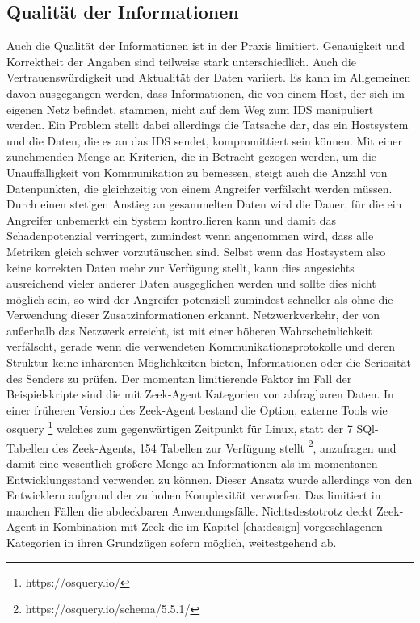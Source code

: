 \subsection{Qualität der Informationen}
Auch die Qualität der Informationen ist in der Praxis limitiert. Genauigkeit und Korrektheit der Angaben sind teilweise stark unterschiedlich. Auch die Vertrauenswürdigkeit und Aktualität der Daten variiert. Es kann im Allgemeinen davon ausgegangen werden, dass Informationen, die von einem Host, der sich im eigenen Netz befindet, stammen, nicht auf dem Weg zum IDS manipuliert werden. Ein Problem stellt dabei allerdings die Tatsache dar, das ein Hostsystem und die Daten, die es an das IDS sendet, kompromittiert sein können. Mit einer zunehmenden Menge an Kriterien, die in Betracht gezogen werden, um die Unauffälligkeit von Kommunikation zu bemessen, steigt auch die Anzahl von Datenpunkten, die gleichzeitig von einem Angreifer verfälscht werden müssen. Durch einen stetigen Anstieg an gesammelten Daten wird die Dauer, für die ein Angreifer unbemerkt ein System kontrollieren kann und damit das Schadenpotenzial verringert, zumindest wenn angenommen wird, dass alle Metriken gleich schwer vorzutäuschen sind. Selbst wenn das Hostsystem also keine korrekten Daten mehr zur Verfügung stellt, kann dies angesichts ausreichend vieler anderer Daten ausgeglichen werden und sollte dies nicht möglich sein, so wird der Angreifer potenziell zumindest schneller als ohne die Verwendung dieser Zusatzinformationen erkannt. Netzwerkverkehr, der von außerhalb das Netzwerk erreicht, ist mit einer höheren Wahrscheinlichkeit verfälscht, gerade wenn die verwendeten Kommunikationsprotokolle und deren Struktur keine inhärenten Möglichkeiten bieten, Informationen oder die Seriosität des Senders zu prüfen.
Der momentan limitierende Faktor im Fall der Beispielskripte sind die mit Zeek-Agent Kategorien von abfragbaren Daten. In einer früheren Version des Zeek-Agent bestand die Option, externe Tools wie osquery \footnote{https://osquery.io/} welches zum gegenwärtigen Zeitpunkt für Linux, statt der 7 SQl-Tabellen des Zeek-Agents, 154 Tabellen zur Verfügung stellt \footnote{https://osquery.io/schema/5.5.1/}, anzufragen und damit eine wesentlich größere Menge an Informationen als im momentanen Entwicklungsstand verwenden zu können. Dieser Ansatz wurde allerdings von den Entwicklern aufgrund der zu hohen Komplexität verworfen. Das limitiert in manchen Fällen die abdeckbaren Anwendungsfälle. Nichtsdestotrotz deckt Zeek-Agent in Kombination mit Zeek die im Kapitel \ref{cha:design} vorgeschlagenen Kategorien in ihren Grundzügen sofern möglich, weitestgehend ab.
